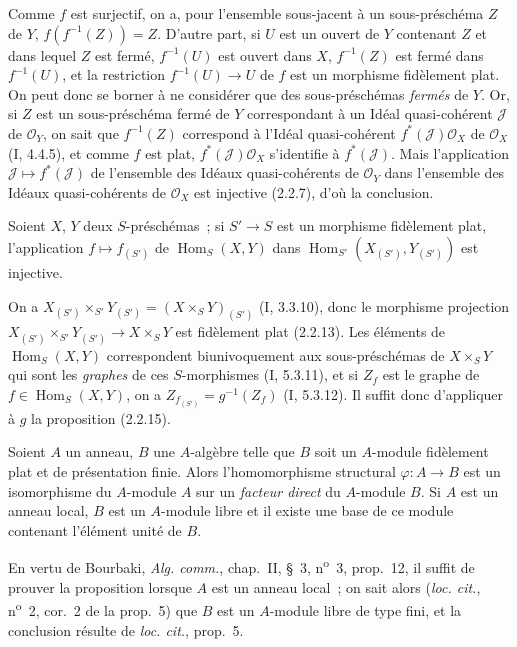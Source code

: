 Comme $f$ est surjectif, on a, pour l'ensemble sous-jacent à un
sous-préschéma $Z$ de $Y$, $f(f^{-1}(Z))=Z$. D'autre part, si $U$ est un
ouvert de $Y$ contenant $Z$ et dans lequel $Z$ est fermé, $f^{-1}(U)$ est
ouvert dans $X$, $f^{-1}(Z)$ est fermé dans $f^{-1}(U)$, et la restriction
$f^{-1}(U)\to U$ de $f$ est un morphisme fidèlement plat. On peut donc se
borner à ne considérer que des sous-préschémas \emph{fermés} de $Y$. Or, si
$Z$ est un sous-préschéma fermé de $Y$ correspondant à un Idéal
quasi-cohérent $\mathscr J$ de $\mathcal O_Y$, on sait que $f^{-1}(Z)$
correspond à l'Idéal quasi-cohérent $f^*(\mathscr J)\mathcal O_X$ de
$\mathcal O_X$ (I, 4.4.5), et comme $f$ est plat,
$f^*(\mathscr J)\mathcal O_X$ s'identifie à $f^*(\mathscr J)$. Mais
l'application $\mathscr J\mapsto f^*(\mathscr J)$ de l'ensemble des Idéaux
quasi-cohérents de $\mathcal O_Y$ dans l'ensemble des Idéaux quasi-cohérents
de $\mathcal O_X$ est injective (2.2.7), d'où la conclusion.

\begin{corollary}[2.2.16]
\label{IV.2.2.16-fr}
Soient $X$, $Y$ deux $S$-préschémas~; si $S'\to S$ est un morphisme
fidèlement plat, l'application $f\mapsto f_{(S')}$ de
$\operatorname{Hom}_S(X,Y)$ dans
$\operatorname{Hom}_{S'}(X_{(S')},Y_{(S')})$ est injective.
\end{corollary}

On a $X_{(S')}\times_{S'}Y_{(S')}=(X\times_S Y)_{(S')}$ (I, 3.3.10), donc le
morphisme projection
$X_{(S')}\times_{S'}Y_{(S')}\to X\times_S Y$ est fidèlement plat (2.2.13).
Les éléments de $\operatorname{Hom}_S(X,Y)$ correspondent biunivoquement aux
sous-préschémas de $X\times_S Y$ qui sont les \emph{graphes} de ces
$S$-morphismes (I, 5.3.11), et si $Z_f$ est le graphe de
$f\in\operatorname{Hom}_S(X,Y)$, on a $Z_{f_{(S')}}=g^{-1}(Z_f)$ (I, 5.3.12).
Il suffit donc d'appliquer à $g$ la proposition (2.2.15).

\begin{proposition}[2.2.17]
\label{IV.2.2.17-fr}
Soient $A$ un anneau, $B$ une $A$-algèbre telle que $B$ soit un $A$-module
fidèlement plat et de présentation finie. Alors l'homomorphisme structural
$\varphi:A\to B$ est un isomorphisme du $A$-module $A$ sur un \emph{facteur
direct} du $A$-module $B$. Si $A$ est un anneau local, $B$ est un $A$-module
libre et il existe une base de ce module contenant l'élément unité de $B$.
\end{proposition}

En vertu de Bourbaki, \emph{Alg. comm.}, chap.~II, \S~3,
n\textsuperscript{o}~3, prop.~12, il suffit de prouver la proposition lorsque
$A$ est un anneau local~; on sait alors (\emph{loc. cit.},
n\textsuperscript{o}~2, cor.~2 de la prop.~5) que $B$ est un $A$-module libre
de type fini, et la conclusion résulte de \emph{loc. cit.}, prop.~5.

